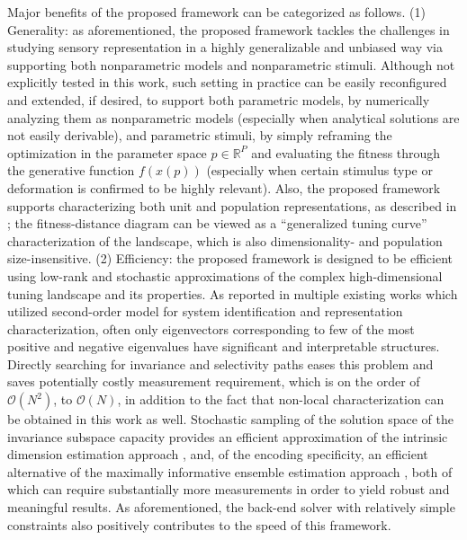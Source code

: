 Major benefits of the proposed framework can be categorized as follows. (1) Generality: as aforementioned, the proposed framework tackles the challenges in studying sensory representation in a highly generalizable and unbiased way via supporting both nonparametric models and nonparametric stimuli. Although not explicitly tested in this work, such setting in practice can be easily reconfigured and extended, if desired, to support both parametric models, by numerically analyzing them as nonparametric models (especially when analytical solutions are not easily derivable), and parametric stimuli, by simply reframing the optimization in the parameter space $p \in \mathbb{R}^P$ and evaluating the fitness through the generative function $f\left(x\left(p\right)\right)$ (especially when certain stimulus type or deformation is confirmed to be highly relevant). Also, the proposed framework supports characterizing both unit and population representations, as described in ; the fitness-distance diagram can be viewed as a ``generalized tuning curve'' characterization of the landscape, which is also dimensionality- and population size-insensitive. (2) Efficiency: the proposed framework is designed to be efficient using low-rank and stochastic approximations of the complex high-dimensional tuning landscape and its properties. As reported in multiple existing works \cite{touryan2002isolation, rust2004spike} which utilized second-order model for system identification and representation characterization, often only eigenvectors corresponding to few of the most positive and negative eigenvalues have significant and interpretable structures. Directly searching for invariance and selectivity paths eases this problem and saves potentially costly measurement requirement, which is on the order of $\mathcal{O}\left(N^2\right)$, to $\mathcal{O}\left(N\right)$, in addition to the fact that non-local characterization can be obtained in this work as well. Stochastic sampling of the solution space of the invariance subspace capacity provides an efficient approximation of the intrinsic dimension estimation approach \cite{kegl2002intrinsic, levina2004maximum}, and, of the encoding specificity, an efficient alternative of the maximally informative ensemble estimation approach \cite{machens2002adaptive}, both of which can require substantially more measurements in order to yield robust and meaningful results. As aforementioned, the back-end solver with relatively simple constraints also positively contributes to the speed of this framework. %

